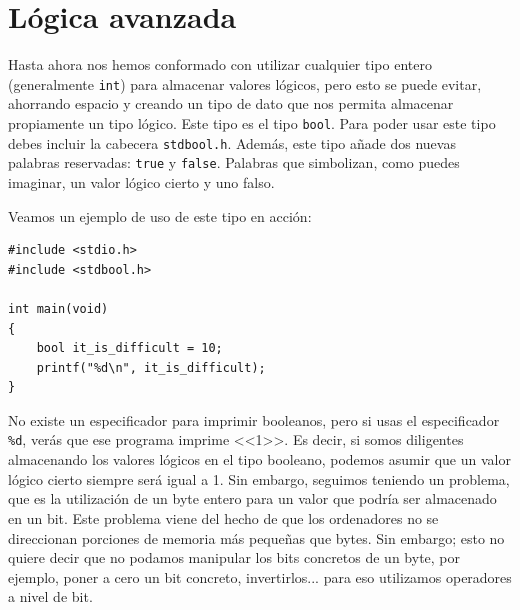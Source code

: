\documentclass[a4paper]{article}
\begin{document}
\section{Lógica avanzada}
Hasta ahora nos hemos conformado con utilizar cualquier tipo entero
(generalmente \verb!int!) para almacenar valores lógicos, pero esto se puede
evitar, ahorrando espacio y creando un tipo de dato que nos permita almacenar
propiamente un tipo lógico. Este tipo es el tipo \verb!bool!. Para poder
usar este tipo debes incluir la cabecera \verb!stdbool.h!. Además, este tipo
añade dos nuevas palabras reservadas: \verb!true! y \verb!false!. Palabras
que simbolizan, como puedes imaginar, un valor lógico cierto y uno falso.

Veamos un ejemplo de uso de este tipo en acción:

\noindent
\begin{minipage}[H]{\linewidth}
\mbox{}
\begin{lstlisting}[style=C,
caption={Ejemplo del uso del tipo \texttt{bool}},
label={lst:bool1}]
#include <stdio.h>
#include <stdbool.h>

int main(void)
{
    bool it_is_difficult = 10;
    printf("%d\n", it_is_difficult);
}
\end{lstlisting}
\end{minipage}

No existe un especificador para imprimir booleanos, pero si usas el
especificador \verb!%d!, verás que ese programa imprime <<1>>. Es decir, si
somos diligentes almacenando los valores lógicos en el tipo booleano,
podemos asumir que un valor lógico cierto siempre será igual a 1.
Sin embargo, seguimos teniendo un problema, que es la utilización de un byte
entero para un valor que podría ser almacenado en un bit. Este problema viene
del hecho de que los ordenadores no se direccionan porciones de memoria más
pequeñas que bytes. Sin embargo; esto no quiere decir que no podamos manipular
los bits concretos de un byte, por ejemplo, poner a cero un bit concreto,
invertirlos... para eso utilizamos operadores a nivel de bit.
\end{document}
